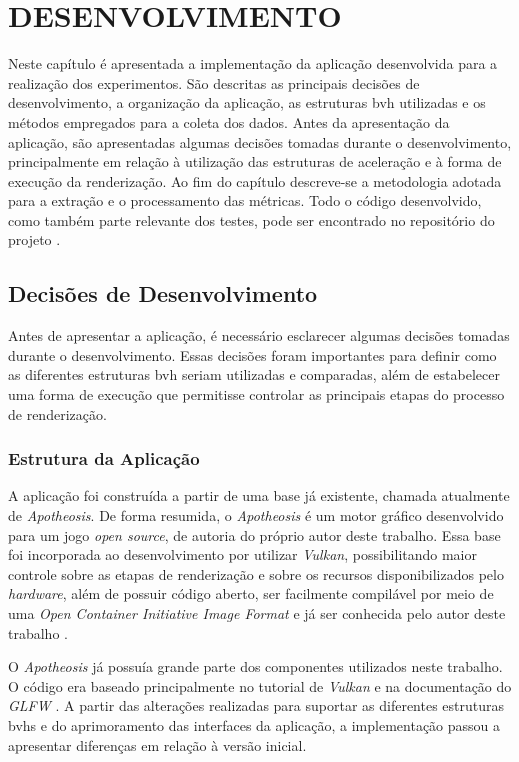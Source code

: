 \chapter{DESENVOLVIMENTO}

Neste capítulo é apresentada a implementação da aplicação desenvolvida para a realização dos experimentos. São descritas as principais decisões de desenvolvimento, a organização da aplicação, as estruturas \gls{bvh} utilizadas e os métodos empregados para a coleta dos dados. Antes da apresentação da aplicação, são apresentadas algumas decisões tomadas durante o desenvolvimento, principalmente em relação à utilização das estruturas de aceleração e à forma de execução da renderização. Ao fim do capítulo descreve-se a metodologia adotada para a extração e o processamento das métricas. Todo o código desenvolvido, como também parte relevante dos testes, pode ser encontrado no repositório do projeto \cite{realtime_BVH_comparison}.

\section{Decisões de Desenvolvimento}

Antes de apresentar a aplicação, é necessário esclarecer algumas decisões tomadas durante o desenvolvimento. Essas decisões foram importantes para definir como as diferentes estruturas \gls{bvh} seriam utilizadas e comparadas, além de estabelecer uma forma de execução que permitisse controlar as principais etapas do processo de renderização.

\subsection{Estrutura da Aplicação}

A aplicação foi construída a partir de uma base já existente, chamada atualmente de \textit{Apotheosis}. De forma resumida, o \textit{Apotheosis} é um motor gráfico desenvolvido para um jogo \textit{open source}, de autoria do próprio autor deste trabalho. Essa base foi incorporada ao desenvolvimento por utilizar \textit{Vulkan}, possibilitando maior controle sobre as etapas de renderização e sobre os recursos disponibilizados pelo \textit{hardware}, além de possuir código aberto, ser facilmente compilável por meio de uma \textit{Open Container Initiative Image Format} e já ser conhecida pelo autor deste trabalho \cite{apotheosis}.

O \textit{Apotheosis} já possuía grande parte dos componentes utilizados neste trabalho. O código era baseado principalmente no tutorial de \textit{Vulkan} \cite{vulkan_tutorial} e na documentação do \textit{GLFW} \cite{glfw_docs}. A partir das alterações realizadas para suportar as diferentes estruturas \glspl{bvh} e do aprimoramento das interfaces da aplicação, a implementação passou a apresentar diferenças em relação à versão inicial.

